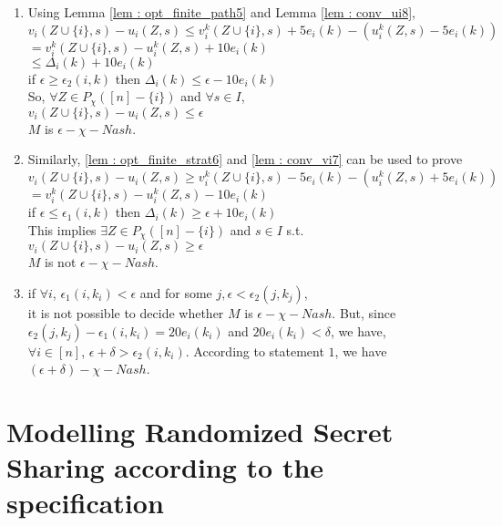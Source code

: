 										\begin{enumerate}
											\item Using Lemma \ref{lem : opt_finite_path5} and Lemma \ref{lem : conv_ui8},\\
											$v_i(Z \cup \{i\},s) - u_i(Z ,s) \le v_i^{k}(Z \cup \{i\},s) + 5e_i(k) - (u_i^{k}(Z ,s) - 5e_i(k) )$\\
											$=v_i^{k}(Z \cup \{i\},s) - u_i^{k}(Z ,s) + 10e_i(k)  $\\
											$\le \Delta_i(k) + 10e_i(k) $\\
											if $\epsilon \ge \epsilon_2(i,k)$ then $\Delta_i(k) \le \epsilon - 10e_i(k)$\\
											So, $\forall Z \in P_\chi([n]-\{i\})$ and $\forall s \in I$, \\
											$v_i(Z \cup \{i\},s) - u_i(Z ,s) \le \epsilon$\\
											$M$ is $\epsilon - \chi-Nash$.
											\item Similarly, \ref{lem : opt_finite_strat6} and \ref{lem : conv_vi7} can be used to prove\\
											$v_i(Z \cup \{i\},s) - u_i(Z ,s) \ge v_i^{k}(Z \cup \{i\},s) - 5e_i(k) - (u_i^{k}(Z ,s) + 5e_i(k) )$\\
											$=v_i^{k}(Z \cup \{i\},s) - u_i^{k}(Z ,s) - 10e_i(k)  $\\
											if $\epsilon \le \epsilon_1(i,k)$ then $\Delta_i(k) \ge \epsilon + 10e_i(k)$\\
											This implies $\exists Z \in P_\chi([n]-\{i\})$ and $s \in I$ s.t.\\
											$v_i(Z \cup \{i\},s) - u_i(Z ,s) \ge \epsilon$\\
											$M$ is not $\epsilon-\chi-Nash$.
											\item if $\forall i$, $\epsilon_1(i,k_i) < \epsilon$ and for some $j, \epsilon < \epsilon_2(j,k_j)$, \\
											it is not possible to decide whether $M$ is $\epsilon-\chi-Nash$. But, since $\epsilon_2(j,k_j)-\epsilon_1(i,k_i)= 20e_i(k_i)$ and $20e_i(k_i) < \delta$, we have,\\
											$\forall i \in [n]$, $\epsilon + \delta > \epsilon_2(i,k_i)$. According to statement $1$, we have\\
											$(\epsilon + \delta)-\chi-Nash$.
											\end{enumerate}\cite{MariPhD}

\section{Modelling Randomized Secret Sharing according to the specification}

